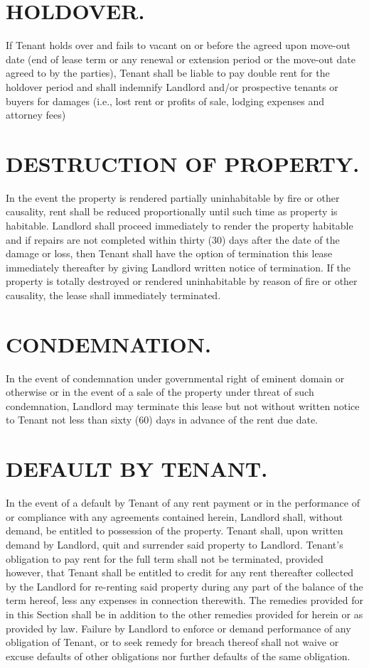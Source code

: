 \documentclass[9pt]{article}
\begin{document}
	\section{HOLDOVER.}
	If Tenant holds over and fails to vacant on or before the agreed upon move-out date (end of lease term or any renewal or extension period or the move-out date agreed to by the parties), Tenant shall be liable to pay double rent for the holdover period and shall indemnify Landlord and/or prospective tenants or buyers for damages (i.e., lost rent or profits of sale, lodging expenses and attorney fees)

	\section{DESTRUCTION OF PROPERTY.}
	In the event the property is rendered partially uninhabitable by fire or other causality, rent shall be reduced proportionally until such time as property is habitable. Landlord shall proceed immediately to render the property habitable and if repairs are not completed within thirty (30) days after the date of the damage or loss, then Tenant shall have the option of termination this lease immediately thereafter by giving Landlord written notice of termination. If the property is totally destroyed or rendered uninhabitable by reason of fire or other causality, the lease shall immediately terminated.
	
	\section{CONDEMNATION.}
	In the event of condemnation under governmental right of eminent domain or otherwise or in the event of a sale of the property under threat of such condemnation, Landlord may terminate this lease but not without written notice to Tenant not less than sixty (60) days in advance of the rent due date.
	
	\section{DEFAULT BY TENANT.}
	In the event of a default by Tenant of any rent payment or in the performance of or compliance with any agreements contained herein, Landlord shall, without demand, be entitled to possession of the property. Tenant shall, upon written demand by Landlord, quit and surrender said property to Landlord. Tenant's obligation to pay rent for the full term shall not be terminated, provided however, that Tenant shall be entitled to credit for any rent thereafter collected by the Landlord for re-renting said property during any part of the balance of the term hereof, less any expenses in connection therewith. The remedies provided for in this Section shall be in addition to the other remedies provided for herein or as provided by law. Failure by Landlord to enforce or demand performance of any obligation of Tenant, or to seek remedy for breach thereof shall not waive or excuse defaults of other obligations nor further defaults of the same obligation.
	
\end{document}

